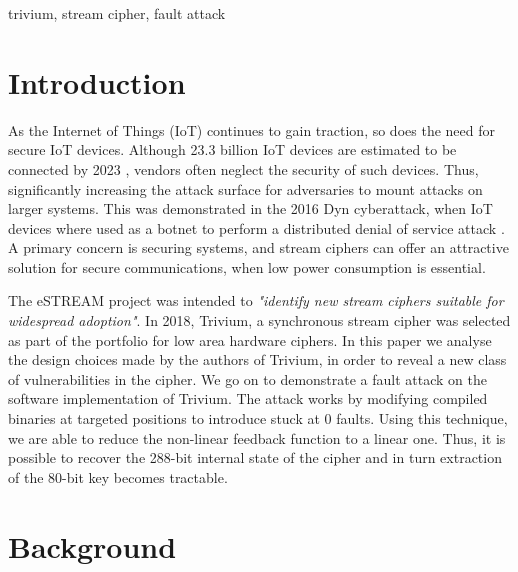 \documentclass[conference]{IEEEtran}
\begin{document}
\begin{IEEEkeywords}
trivium, stream cipher, fault attack
\end{IEEEkeywords}

\section{Introduction}
As the Internet of Things (IoT) continues to gain traction, so does the need for secure IoT devices. Although 23.3 billion IoT devices are estimated to be connected by 2023 \cite{iot}, vendors often neglect the security of such devices. Thus, significantly increasing the attack surface for adversaries to mount attacks on larger systems. This was demonstrated in the 2016 Dyn cyberattack, when IoT devices where used as a botnet to perform a distributed denial of service attack \cite{dyn}. A primary concern is securing systems, and stream ciphers can offer an attractive solution for secure communications, when low power consumption is essential.

The eSTREAM project was intended to \textit{"identify new stream ciphers suitable for widespread adoption"}.\cite{call} In 2018, Trivium, a synchronous stream cipher was selected as part of the portfolio for low area hardware ciphers. In this paper we analyse the design choices made by the authors of Trivium, in order to reveal a new class of vulnerabilities in the cipher. We go on to demonstrate a fault attack on the software implementation of Trivium. The attack works by modifying compiled binaries at targeted positions to introduce stuck at 0 faults. Using this technique, we are able to reduce the non-linear feedback function to a linear one. Thus, it is possible to recover the 288-bit internal state of the cipher and in turn extraction of the 80-bit key becomes tractable.

\section{Background}
\end{document}
